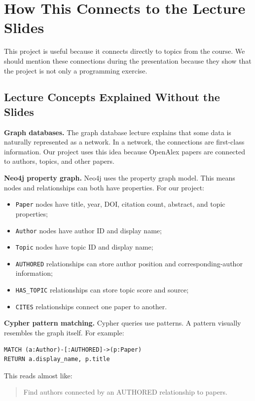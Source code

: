 \documentclass[11pt]{article}
\begin{document}
\section{How This Connects to the Lecture Slides}

This project is useful because it connects directly to topics from the course.
We should mention these connections during the presentation because they show that the project is not only a programming exercise.

\subsection{Lecture Concepts Explained Without the Slides}

\textbf{Graph databases.}
The graph database lecture explains that some data is naturally represented as a network.
In a network, the connections are first-class information.
Our project uses this idea because OpenAlex papers are connected to authors, topics, and other papers.

\textbf{Neo4j property graph.}
Neo4j uses the property graph model.
This means nodes and relationships can both have properties.
For our project:

\begin{itemize}
    \item \texttt{Paper} nodes have title, year, DOI, citation count, abstract, and topic properties;
    \item \texttt{Author} nodes have author ID and display name;
    \item \texttt{Topic} nodes have topic ID and display name;
    \item \texttt{AUTHORED} relationships can store author position and corresponding-author information;
    \item \texttt{HAS\_TOPIC} relationships can store topic score and source;
    \item \texttt{CITES} relationships connect one paper to another.
\end{itemize}

\textbf{Cypher pattern matching.}
Cypher queries use patterns.
A pattern visually resembles the graph itself.
For example:

\begin{verbatim}
MATCH (a:Author)-[:AUTHORED]->(p:Paper)
RETURN a.display_name, p.title
\end{verbatim}

This reads almost like:

\begin{quote}
Find authors connected by an AUTHORED relationship to papers.
\end{quote}
\end{document}
